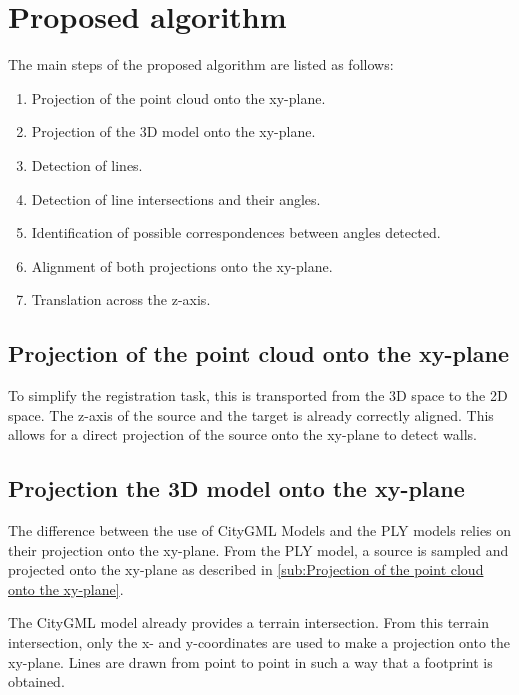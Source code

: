     \section{Proposed algorithm}
    The main steps of the proposed algorithm are listed as follows:
    \begin{enumerate}
        \item Projection of the point cloud onto the xy-plane.
        \item Projection of the 3D model onto the xy-plane.
        \item Detection of lines.
        \item Detection of line intersections and their angles.
        \item Identification of possible correspondences between angles detected.
        \item Alignment of both projections onto the xy-plane.
        \item Translation across the z-axis.
    \end{enumerate}

    \subsection{Projection of the point cloud onto the xy-plane}
    \label{sub:Projection of the point cloud onto the xy-plane}
        To simplify the registration task, this is transported from the 3D space to the 2D space.
        The z-axis of the source and the target is already correctly aligned.
        This allows for a direct projection of the source onto the xy-plane to detect walls.

    \subsection{Projection the 3D model onto the xy-plane}
        The difference between the use of CityGML Models and the PLY models relies on their projection onto the xy-plane.
        From the PLY model, a source is sampled and projected onto the xy-plane as described in \autoref{sub:Projection of the point cloud onto the xy-plane}.
        
        The CityGML model already provides a terrain intersection.
        From this terrain intersection, only the x- and y-coordinates are used to make a projection onto the xy-plane.
        Lines are drawn from point to point in such a way that a footprint is obtained.

